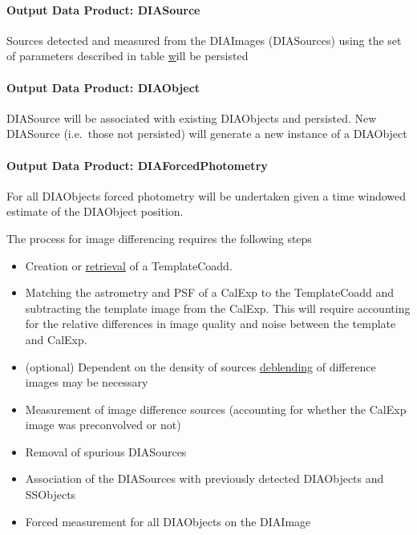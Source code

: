 \paragraph{Output Data Product: DIASource}

Sources detected and measured from the DIAImages (DIASources) using the set of parameters described in table \hyperref[table:ap_features] will be persisted


\paragraph{Output Data Product: DIAObject}

DIASource will be associated with existing DIAObjects and persisted. New DIASource (i.e.\ those not persisted) will generate a new instance of a DIAObject 

\paragraph{Output Data Product: DIAForcedPhotometry}

For all DIAObjects forced photometry will be undertaken given a time windowed estimate of the DIAObject position.


The process for image differencing requires the following steps
\begin{itemize}
\item Creation or \hyperref[sec:acRetrieveTemplate]{retrieval} of a TemplateCoadd.
\item Matching the astrometry and PSF of a CalExp to the TemplateCoadd and subtracting the template image from the CalExp. This will require accounting for the relative differences in image quality and noise between the template and CalExp.
\item (optional) Dependent on the density of sources \hyperref[sec:acSingleFrameDeblending]{deblending} of difference images may be necessary
\item Measurement of image difference sources (accounting for whether the CalExp image was preconvolved or not)
\item Removal of spurious DIASources 
\item Association of the DIASources with previously detected DIAObjects and SSObjects
\item Forced measurement for all DIAObjects on the DIAImage
\end{itemize}



\label{sec:apCRTemplates}

